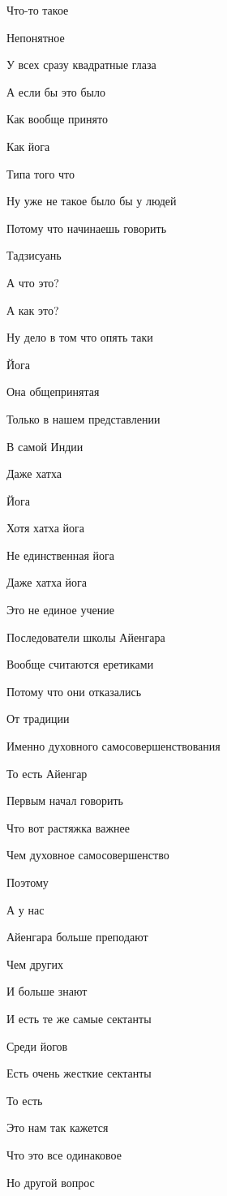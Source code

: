 Что-то такое

Непонятное

У всех сразу квадратные глаза

А если бы это было

Как вообще принято

Как йога

Типа того что

Ну уже не такое было бы у людей

Потому что начинаешь говорить

Тадзисуань

А что это?

А как это?

Ну дело в том что опять таки

Йога

Она общепринятая

Только в нашем представлении

В самой Индии

Даже хатха

Йога

Хотя хатха йога

Не единственная йога

Даже хатха йога

Это не единое учение

Последователи школы Айенгара

Вообще считаются еретиками

Потому что они отказались

От традиции

Именно духовного самосовершенствования

То есть Айенгар

Первым начал говорить

Что вот растяжка важнее

Чем духовное самосовершенство

Поэтому

А у нас

Айенгара больше преподают

Чем других

И больше знают

И есть те же самые сектанты

Среди йогов

Есть очень жесткие сектанты

То есть

Это нам так кажется

Что это все одинаковое

Но другой вопрос

